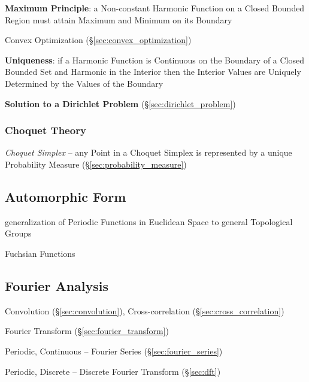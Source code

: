 \textbf{Maximum Principle}: a Non-constant Harmonic Function on a
Closed Bounded Region must attain Maximum and Minimum on its Boundary

Convex Optimization (\S\ref{sec:convex_optimization})


\textbf{Uniqueness}: if a Harmonic Function is Continuous on the
Boundary of a Closed Bounded Set and Harmonic in the Interior then the
Interior Values are Uniquely Determined by the Values of the Boundary


\textbf{Solution to a Dirichlet Problem}
(\S\ref{sec:dirichlet_problem})



\subsubsection{Choquet Theory}\label{sec:choquet_theory}

\emph{Choquet Simplex} -- any Point in a Choquet Simplex is represented by a
unique Probability Measure (\S\ref{sec:probability_measure})



\subsection{Automorphic Form}\label{sec:automorphic_form}

generalization of Periodic Functions in Euclidean Space to general Topological
Groups

Fuchsian Functions



\subsection{Fourier Analysis}\label{sec:fourier_analysis}

\fist Convolution (\S\ref{sec:convolution}), Cross-correlation
(\S\ref{sec:cross_correlation})

\fist Fourier Transform (\S\ref{sec:fourier_transform})

Periodic, Continuous -- Fourier Series (\S\ref{sec:fourier_series})

Periodic, Discrete -- Discrete Fourier Transform (\S\ref{sec:dft})

